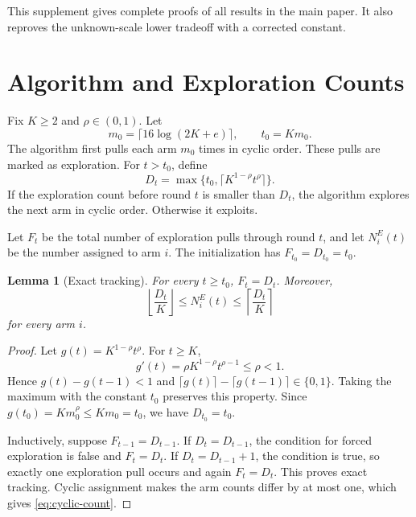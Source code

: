 \documentclass[twoside]{article}
\newtheorem{lemma}[theorem]{Lemma}
\begin{document}


This supplement gives complete proofs of all results in the main paper. It
also reproves the unknown-scale lower tradeoff with a corrected constant.

\section{Algorithm and Exploration Counts}
\label{app:schedule}

Fix $K\geq2$ and $\rho\in(0,1)$. Let
\[
 m_0=\lceil16\log(2K+e)\rceil,
 \qquad t_0=Km_0.
\]
The algorithm first pulls each arm $m_0$ times in cyclic order. These pulls
are marked as exploration. For $t>t_0$, define
\[
 D_t=\max\{t_0,\lceil K^{1-\rho}t^\rho\rceil\}.
\]
If the exploration count before round $t$ is smaller than $D_t$, the
algorithm explores the next arm in cyclic order. Otherwise it exploits.

Let $F_t$ be the total number of exploration pulls through round $t$, and
let $N_i^E(t)$ be the number assigned to arm $i$. The initialization has
$F_{t_0}=D_{t_0}=t_0$.

\begin{lemma}[Exact tracking]
\label{lem:tracking}
For every $t\geq t_0$, $F_t=D_t$. Moreover,
\begin{equation}
 \left\lfloor\frac{D_t}{K}\right\rfloor
 \leq N_i^E(t)
 \leq\left\lceil\frac{D_t}{K}\right\rceil
 \label{eq:cyclic-count}
\end{equation}
for every arm $i$.
\end{lemma}

\begin{proof}
Let $g(t)=K^{1-\rho}t^\rho$. For $t\geq K$,
\[
 g'(t)=\rho K^{1-\rho}t^{\rho-1}\leq\rho<1.
\]
Hence $g(t)-g(t-1)<1$ and
$\lceil g(t)\rceil-\lceil g(t-1)\rceil\in\{0,1\}$. Taking the maximum with
the constant $t_0$ preserves this property. Since
$g(t_0)=K m_0^\rho\leq Km_0=t_0$, we have $D_{t_0}=t_0$.

Inductively, suppose $F_{t-1}=D_{t-1}$. If $D_t=D_{t-1}$, the condition for
forced exploration is false and $F_t=D_t$. If $D_t=D_{t-1}+1$, the
condition is true, so exactly one exploration pull occurs and again
$F_t=D_t$. This proves exact tracking. Cyclic assignment makes the arm
counts differ by at most one, which gives \eqref{eq:cyclic-count}.
\end{proof}
\end{document}
